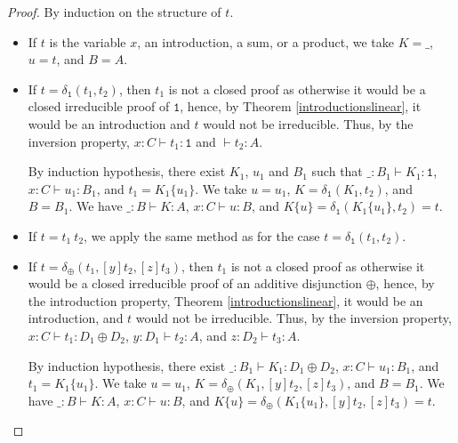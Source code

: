 \documentclass[screen, sigconf,authorversion,nonacm]{acmart}
\theoremstyle{acmdefinition}
\numberwithin{equation}{section}
\newcommand\abstr[1]{[#1]}
\newcommand\one{\ensuremath{\mathtt 1}}
\newcommand\elimone{\delta_{\one}}
\newcommand\elimplus{\delta_{\oplus}}
\begin{document}
\begin{proof}
  By induction on the structure of $t$.

\begin{itemize}
    \item If $t$ is the variable $x$, an introduction, a sum, or a
     product, we take $K = \_$, $u = t$, and $B = A$.

    \item If $t = \elimone(t_1,t_2)$, then $t_1$ is not a closed proof as
      otherwise it would be a closed irreducible proof of $\one$, hence,
      by Theorem \ref{introductionslinear}, it would be an introduction and $t$
      would not be irreducible. Thus, by the inversion property, $x:C
      \vdash t_1:\one$ and $\vdash t_2:A$.

      By induction hypothesis, there exist $K_1$, $u_1$ and $B_1$ such
      that $\_:B_1 \vdash K_1:\one$, $x:C \vdash u_1:B_1$, and $t_1 =
      K_1\{u_1\}$.  We take $u = u_1$, $K = \elimone(K_1,t_2)$, and $B =
      B_1$.  We have $\_:B \vdash K:A$, $x:C \vdash u:B$, and $K\{u\} =
      \elimone(K_1\{u_1\},t_2) = t$.
      
    \item If $t = t_1~t_2$,
          we apply the same method as for the case $t = \elimone(t_1,t_2)$.



    \item If $t = \elimplus(t_1,\abstr{y}t_2,\abstr{z}t_3)$, then
      $t_1$ is not a closed proof as otherwise it would be a closed
      irreducible proof of an additive disjunction $\oplus$, hence, by
      the introduction property, Theorem \ref{introductionslinear}, it
      would be an introduction, and $t$ would not be
      irreducible. Thus, by the inversion property, $x:C \vdash
      t_1:D_1 \oplus D_2$, $y:D_1 \vdash t_2:A$, and $z:D_2 \vdash
      t_3:A$.

      By induction hypothesis, there exist $\_:B_1 \vdash K_1:D_1 \oplus
      D_2$, $x:C \vdash u_1:B_1$, and $t_1 = K_1\{u_1\}$.  We take $u =
      u_1$, $K = \elimplus(K_1,\abstr{y}t_2,\abstr{z} t_3)$, and
      $B = B_1$.  We have
      $\_:B \vdash K:A$, $x:C \vdash u:B$, and $K\{u\} =
      \elimplus(K_1\{u_1\},\abstr{y}t_2,\abstr{z}t_3) = t$.
      \qedhere
\end{itemize}
\end{proof}
\end{document}
